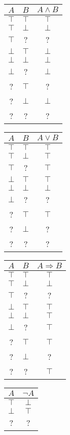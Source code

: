 \begin{center}
\begin{tabular}{|c|c|c|}
\hline
$A$ & $B$ & $A\wedge B$ \\ 
\hline
$\top $ & $\top $ & $\top $ \\
$\top $ & $\bot $ & $\bot $ \\
$\top $ & ? & ? \\ 
$\bot $ & $\top $ & $\bot $ \\
$\bot $ & $\bot $ & $\bot $ \\ 
$\bot $ & ? & $\bot $ \\ 
? & $\top $ & ? \\ 
? & $\bot $ & $\bot $ \\ 
? & ? & ? \\ 
\hline
\end{tabular}
\qquad
\begin{tabular}{|c|c|c|}
\hline
$A$ & $B$ & $A\vee B$ 
\\ \hline
$\top $ & $\top $ & $\top $ \\ 
$\top $ & $\bot $ & $\top $ \\ 
$\top $ & ? & $\top $ \\ 
$\bot $ & $\top $ & $\top $ \\ 
$\bot $ & $\bot $ & $\bot $ \\ 
$\bot $ & ? & ? \\ 
? & $\top $ & $\top $ \\ 
? & $\bot $ & ? \\ 
? & ? & ? \\ 
\hline
\end{tabular}%
\qquad 
\begin{tabular}{|c|c|c|}
\hline
$A$ & $B$ & $A\Rightarrow B$ 
\\ \hline
$\top $ & $\top $ & $\top $ \\ 
$\top $ & $\bot $ & $\bot $ \\ 
$\top $ & ? & ? \\ 
$\bot $ & $\top $ & $\top $ \\ 
$\bot $ & $\bot $ & $\top $ \\ 
$\bot $ & ? & $\top $ \\ 
? & $\top $ & $\top $ \\ 
? & $\bot $ & ? \\ 
? & ? & $\top $ \\ 
\hline
\end{tabular}%
\qquad 
\begin{tabular}{|c|c|}
\hline
$A$ & $ \neg A$ \\ 
\hline
$\top $ & $\bot $ \\ 
$\bot $ & $\top $ \\ 
? & ? \\ 
\hline
\end{tabular}%
\end{center}

